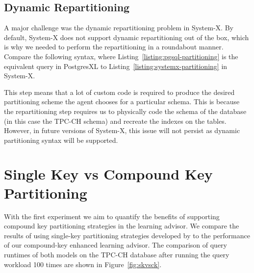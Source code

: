 \subsection{Dynamic Repartitioning}
A major challenge was the dynamic repartitioning problem in System-X. By default, System-X does not support dynamic repartitioning out of the box, which is why we needed to perform the repartitioning in a roundabout manner. Compare the following syntax, where Listing~\ref{listing:pgsql-partitioning} is the equivalent query in PostgresXL to Listing~\ref{listing:systemx-partitioning} in System-X. 



This step means that a lot of custom code is required to produce the desired partitioning scheme the agent chooses for a particular schema. This is because the repartitioning step requires us to physically code the schema of the database (in this case the TPC-CH schema) and recreate the indexes on the tables. However, in future versions of System-X, this issue will not persist as dynamic partitioning syntax will be supported. 

\section{Single Key vs Compound Key Partitioning}
\label{sec:skvsck}

With the first experiment we aim to quantify the benefits of supporting compound key partitioning strategies in the learning advisor. We compare the results of using single-key partitioning strategies developed by \citeauthor{Hilprecht:2019:TLP:3329859.3329876} to the performance of our compound-key enhanced learning advisor. 
The comparison of query runtimes of both models on the TPC-CH database after running the query workload 100 times are shown in Figure~\ref{fig:skvsck}.

